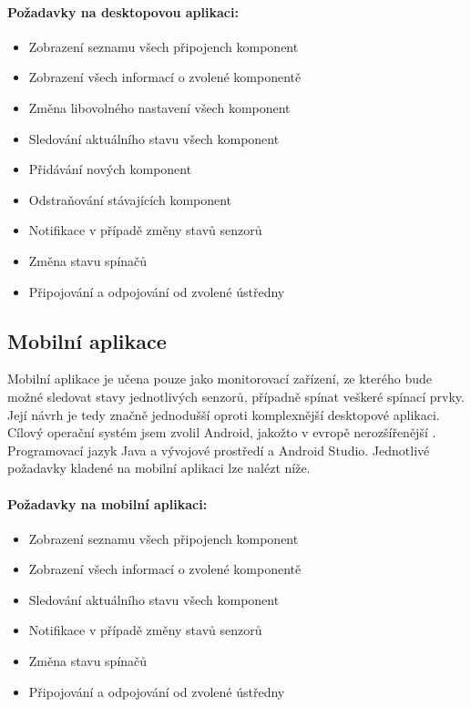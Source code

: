 \documentclass[FM,DP]{tulthesis}  %
\begin{document}
\paragraph{Požadavky na desktopovou aplikaci:}
\begin{itemize}
\item Zobrazení seznamu všech připojench komponent
\item Zobrazení všech informací o zvolené komponentě
\item Změna libovolného nastavení všech komponent
\item Sledování aktuálního stavu všech komponent
\item Přidávání nových komponent
\item Odstraňování stávajících komponent
\item Notifikace v případě změny stavů senzorů
\item Změna stavu spínačů
\item Připojování a odpojování od zvolené ústředny
\end{itemize}

\subsection{Mobilní aplikace}
Mobilní aplikace je učena pouze jako monitorovací zařízení, ze kterého bude možné sledovat stavy jednotlivých senzorů, případně spínat veškeré spínací prvky. Její návrh je tedy značně jednodušší oproti komplexnější desktopové aplikaci. Cílový operační systém jsem zvolil Android, jakožto v evropě nerozšířenější \cite{MobileMarketShare}. Programovací jazyk Java a vývojové prostředí a Android Studio. Jednotlivé požadavky kladené na mobilní aplikaci lze nalézt níže.

\paragraph{Požadavky na mobilní aplikaci:}
\begin{itemize}
\item Zobrazení seznamu všech připojench komponent
\item Zobrazení všech informací o zvolené komponentě
\item Sledování aktuálního stavu všech komponent
\item Notifikace v případě změny stavů senzorů
\item Změna stavu spínačů
\item Připojování a odpojování od zvolené ústředny
\end{itemize}
\end{document}
